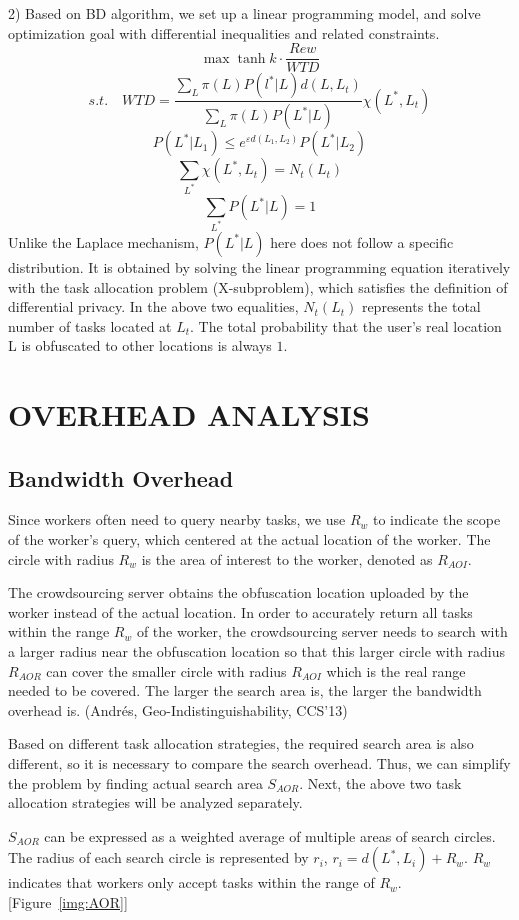 2) Based on BD algorithm, we set up a linear programming model, and solve optimization goal with differential inequalities and related constraints.
$$
	\max \tanh {k \cdot \frac{Rew}{WTD}}
$$
$$
	s.t. \quad WTD=\frac {\sum_L \pi(L) P(l^*|L) d(L,L_t)} {\sum_L \pi(L) P(L^*|L)} \chi(L^*,L_t)
$$
$$
	P(L^*|L_1) \leq e^{\varepsilon d(L_1,L_2)} P(L^*|L_2) 
$$
$$
	\sum_{L^*} \chi(L^*,L_t)=N_t (L_t)
$$
$$
	\sum_{L^*} P(L^*|L)=1
$$
Unlike the Laplace mechanism, $P(L^*|L)$ here does not follow a specific distribution. It is obtained by solving the linear programming equation iteratively with the task allocation problem (X-subproblem), which satisfies the definition of differential privacy. In the above two equalities, $N_t (L_t)$ represents the total number of tasks located at $L_t$. The total probability that the user’s real location L is obfuscated to other locations is always $1$.

\section{OVERHEAD ANALYSIS} %
\label{Sec5}
\subsection{Bandwidth Overhead} %
Since workers often need to query nearby tasks, we use $R_w$ to indicate the scope of the worker's query, which centered at the actual location of the worker. The circle with radius $R_w$ is the area of interest to the worker, denoted as $R_{AOI}$.

The crowdsourcing server obtains the obfuscation location uploaded by the worker instead of the actual location. In order to accurately return all tasks within the range $R_w$ of the worker, the crowdsourcing server needs to search with a larger radius near the obfuscation location so that this larger circle with radius $R_{AOR}$ can cover the smaller circle with radius $R_{AOI}$ which is the real range needed to be covered. The larger the search area is, the larger the bandwidth overhead is. (Andrés, Geo-Indistinguishability, CCS’13)

Based on different task allocation strategies, the required search area is also different, so it is necessary to compare the search overhead. Thus, we can simplify the problem by finding actual search area $S_{AOR}$. Next, the above two task allocation strategies will be analyzed separately.

$S_{AOR}$ can be expressed as a weighted average of multiple areas of search circles. The radius of each search circle is represented by $r_i$, $r_i=d(L^*,L_i)+R_w$. $R_w$ indicates that workers only accept tasks within the range of $R_w$. [Figure~\ref{img:AOR}]

